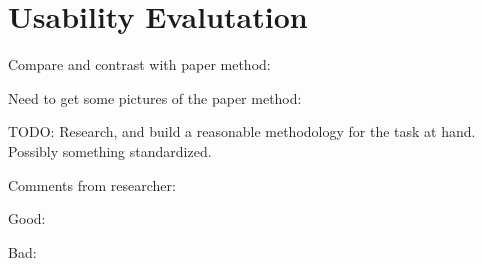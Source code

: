 \chapter{Usability Evalutation}

Compare and contrast with paper method:

Need to get some pictures of the paper method:



TODO:  Research,  and build a reasonable methodology for the task at hand.  Possibly something standardized.






Comments from researcher:

Good:

Bad:

